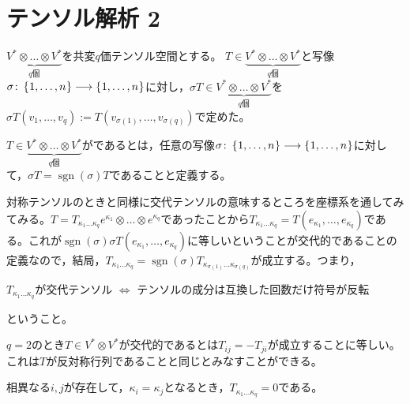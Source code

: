 \documentclass[uplatex]{jsarticle}
\DeclareMathOperator{\sgn}{sgn}
\begin{document}
\fi

\section{テンソル解析 2}
\par
$\underbrace{V^{*} \otimes \dots \otimes V^{*}}_{q\text{個}}$を共変$q$価テンソル空間とする。
$T \in \underbrace{V^{*} \otimes \dots \otimes V^{*}}_{q\text{個}}$と写像$\sigma \colon \Set{\hspace{-1.8pt} 1,\dots,n \hspace{-1.8pt}} \longrightarrow \Set{\hspace{-1.8pt} 1,\dots,n \hspace{-1.8pt}}$に対し，$\sigma T \in \underbrace{V^{*} \otimes \dots \otimes V^{*}}_{q\text{個}}$を$\sigma T (v_{1}, \dots, v_{q}) := T(v_{\sigma(1)},\dots, v_{\sigma(q)})$で定めた。

\begin{teigi}[交代テンソル]
  $T \in \underbrace{V^{*} \otimes \dots \otimes V^{*}}_{q\text{個}}$がであるとは，任意の写像$\sigma \colon \Set{\hspace{-1.8pt} 1,\dots,n \hspace{-1.8pt}} \longrightarrow \Set{\hspace{-1.8pt} 1,\dots,n \hspace{-1.8pt}}$に対して，$\sigma T = \sgn (\sigma) T$であることと定義する。
\end{teigi}

対称テンソルのときと同様に交代テンソルの意味するところを座標系を通してみてみる。$T = T_{\kappa_{1} \dots \kappa_{q}} e^{\kappa_{1}} \otimes \dots \otimes e^{\kappa_{q}}$であったことから$T_{\kappa_{1} \dots \kappa_{q}} = T(e_{\kappa_{1}}, \dots, e_{\kappa_{q}})$である。これが$\sgn (\sigma) \sigma T (e_{\kappa_{1}}, \dots, e_{\kappa_{q}})$に等しいということが交代的であることの定義なので，結局，$T_{\kappa_{1} \dots \kappa_{q}} = \sgn(\sigma) T_{\kappa_{\sigma(1)}\dots \kappa_{\sigma(q)}}$が成立する。つまり，
\begin{center}
  $T_{\kappa_{1}\dots\kappa_{q}}$が交代テンソル $\iff$ テンソルの成分は互換した回数だけ符号が反転
\end{center}
ということ。

\begin{rei}
  $q = 2$のとき$T \in V^{*} \otimes V^{*}$が交代的であるとは$T_{ij} = -T_{ji}$が成立することに等しい。これは$T$が反対称行列であることと同じとみなすことができる。
\end{rei}

\begin{remark}
  相異なる$i,j$が存在して，$\kappa_{i} = \kappa_{j}$となるとき，$T_{\kappa_{1}\dots\kappa_{q}} = 0$である。
\end{remark}
\end{document}
